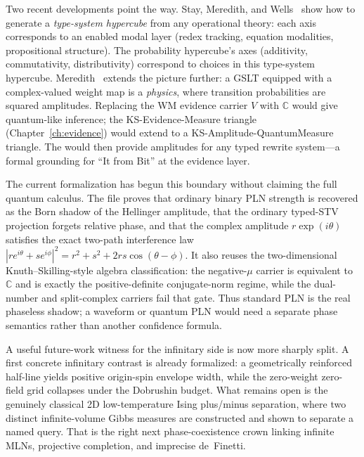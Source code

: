 \documentclass[11pt,openany]{report}
\begin{document}
Two recent developments point the way.
Stay, Meredith, and Wells~\cite{StayMeredithWells2026}
show how to generate a \emph{type-system hypercube} from any
operational theory: each axis corresponds to an enabled modal
layer (redex tracking, equation modalities, propositional
structure).  The probability hypercube's axes (additivity,
commutativity, distributivity) correspond to choices in this
type-system hypercube.
Meredith~\cite{meredith2026ccc} extends the picture further:
a GSLT equipped with a complex-valued weight map is a
\emph{physics}, where transition probabilities are squared
amplitudes.  Replacing the WM evidence carrier $V$ with
$\mathbb{C}$ would give quantum-like inference; the
KS-Evidence-Measure triangle (Chapter~\ref{ch:evidence})
would extend to a KS-Amplitude-QuantumMeasure triangle.
The  would then provide
amplitudes for any typed rewrite system---a formal grounding
for ``It from Bit'' at the evidence layer.

The current formalization has begun this boundary without claiming the
full quantum calculus.  The file
 proves that ordinary
binary PLN strength is recovered as the Born shadow of the Hellinger
amplitude, that the ordinary typed-STV projection forgets relative
phase, and that the complex amplitude
$r\exp(i\theta)$ satisfies the exact two-path interference law
$|r e^{i\theta}+s e^{i\phi}|^2
= r^2+s^2+2rs\cos(\theta-\phi)$.  It also reuses the
two-dimensional Knuth--Skilling-style algebra classification:
the negative-$\mu$ carrier is equivalent to $\mathbb{C}$ and is exactly
the positive-definite conjugate-norm regime, while the dual-number and
split-complex carriers fail that gate.  Thus standard PLN is the real
phaseless shadow; a waveform or quantum PLN would need a separate phase
semantics rather than another confidence formula.

A useful future-work witness for the infinitary side is now more sharply
split. A first concrete infinitary contrast is already formalized: a
geometrically reinforced half-line yields positive origin-spin envelope
width, while the zero-weight zero-field grid collapses under the Dobrushin
budget. What remains open is the genuinely classical 2D low-temperature
Ising plus/minus separation, where two distinct infinite-volume Gibbs
measures are constructed and shown to separate a named query. That is the
right next phase-coexistence crown linking infinite MLNs, projective
completion, and imprecise de~Finetti.
\end{document}
